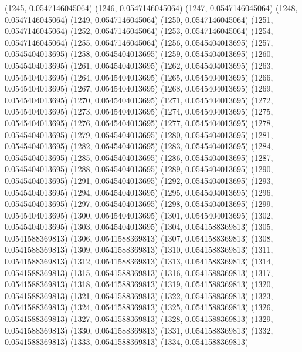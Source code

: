 {					(1245, 0.0547146045064)
					(1246, 0.0547146045064)
					(1247, 0.0547146045064)
					(1248, 0.0547146045064)
					(1249, 0.0547146045064)
					(1250, 0.0547146045064)
					(1251, 0.0547146045064)
					(1252, 0.0547146045064)
					(1253, 0.0547146045064)
					(1254, 0.0547146045064)
					(1255, 0.0547146045064)
					(1256, 0.0545404013695)
					(1257, 0.0545404013695)
					(1258, 0.0545404013695)
					(1259, 0.0545404013695)
					(1260, 0.0545404013695)
					(1261, 0.0545404013695)
					(1262, 0.0545404013695)
					(1263, 0.0545404013695)
					(1264, 0.0545404013695)
					(1265, 0.0545404013695)
					(1266, 0.0545404013695)
					(1267, 0.0545404013695)
					(1268, 0.0545404013695)
					(1269, 0.0545404013695)
					(1270, 0.0545404013695)
					(1271, 0.0545404013695)
					(1272, 0.0545404013695)
					(1273, 0.0545404013695)
					(1274, 0.0545404013695)
					(1275, 0.0545404013695)
					(1276, 0.0545404013695)
					(1277, 0.0545404013695)
					(1278, 0.0545404013695)
					(1279, 0.0545404013695)
					(1280, 0.0545404013695)
					(1281, 0.0545404013695)
					(1282, 0.0545404013695)
					(1283, 0.0545404013695)
					(1284, 0.0545404013695)
					(1285, 0.0545404013695)
					(1286, 0.0545404013695)
					(1287, 0.0545404013695)
					(1288, 0.0545404013695)
					(1289, 0.0545404013695)
					(1290, 0.0545404013695)
					(1291, 0.0545404013695)
					(1292, 0.0545404013695)
					(1293, 0.0545404013695)
					(1294, 0.0545404013695)
					(1295, 0.0545404013695)
					(1296, 0.0545404013695)
					(1297, 0.0545404013695)
					(1298, 0.0545404013695)
					(1299, 0.0545404013695)
					(1300, 0.0545404013695)
					(1301, 0.0545404013695)
					(1302, 0.0545404013695)
					(1303, 0.0545404013695)
					(1304, 0.0541588369813)
					(1305, 0.0541588369813)
					(1306, 0.0541588369813)
					(1307, 0.0541588369813)
					(1308, 0.0541588369813)
					(1309, 0.0541588369813)
					(1310, 0.0541588369813)
					(1311, 0.0541588369813)
					(1312, 0.0541588369813)
					(1313, 0.0541588369813)
					(1314, 0.0541588369813)
					(1315, 0.0541588369813)
					(1316, 0.0541588369813)
					(1317, 0.0541588369813)
					(1318, 0.0541588369813)
					(1319, 0.0541588369813)
					(1320, 0.0541588369813)
					(1321, 0.0541588369813)
					(1322, 0.0541588369813)
					(1323, 0.0541588369813)
					(1324, 0.0541588369813)
					(1325, 0.0541588369813)
					(1326, 0.0541588369813)
					(1327, 0.0541588369813)
					(1328, 0.0541588369813)
					(1329, 0.0541588369813)
					(1330, 0.0541588369813)
					(1331, 0.0541588369813)
					(1332, 0.0541588369813)
					(1333, 0.0541588369813)
					(1334, 0.0541588369813)
}
